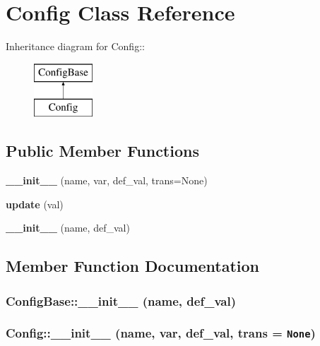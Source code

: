 \section{Config Class Reference}
\label{classConfig}
Inheritance diagram for Config::\begin{figure}[H]
\begin{center}
\leavevmode
\includegraphics[height=2cm]{classConfig}
\end{center}
\end{figure}
\subsection*{Public Member Functions}
\begin{CompactItemize}
\item 
{\bf \_\-\_\-init\_\-\_\-} (name, var, def\_\-val, trans=None)
\item 
{\bf update} (val)
\item 
{\bf \_\-\_\-init\_\-\_\-} (name, def\_\-val)
\end{CompactItemize}


\subsection{Member Function Documentation}
\subsubsection{\setlength{\rightskip}{0pt plus 5cm}Config\-Base::\_\-\_\-init\_\-\_\- (name, def\_\-val)\hspace{0.3cm}{\tt  [inherited]}}\label{classConfigBase_ConfigBasea0}


\subsubsection{\setlength{\rightskip}{0pt plus 5cm}Config::\_\-\_\-init\_\-\_\- (name, var, def\_\-val, trans = {\tt None})}\label{classConfig_Configa0}


